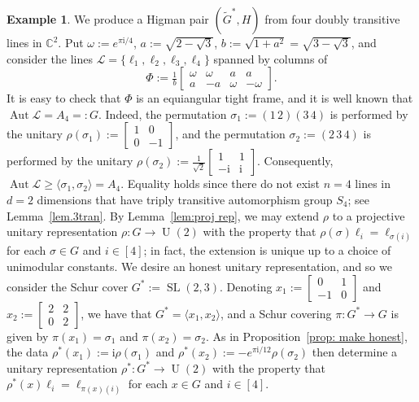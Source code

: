 \documentclass[11pt]{article}
\theoremstyle{definition}
\newtheorem{example}[theo]{Example}
\numberwithin{equation}{section}
\begin{document}
\begin{example}
\label{ex:Higman pair from 2x4}
We produce a Higman pair $(\tilde{G}^*,H)$ from four doubly transitive lines in $\mathbb{C}^2$.
Put $\omega := e^{\pi \mathrm{i}/4}$, $a := \sqrt{2 - \sqrt{3}}$, $b:=\sqrt{1+a^2} = \sqrt{3-\sqrt{3}}$, and consider the lines $\mathscr{L} = \{\ell_1,\ell_2,\ell_3,\ell_4\}$ spanned by columns of
\[
\Phi := \tfrac{1}{b}\left[ \begin{array}{rrrr}
\omega & \omega & a & a \\
a & -a & \omega & - \omega
\end{array} \right].
\]
It is easy to check that $\Phi$ is an equiangular tight frame, and it is well known that $\operatorname{Aut} \mathscr{L} = A_4 =: G$.
Indeed, the permutation $\sigma_1 := (1\, 2)(3\, 4)$ is performed by the unitary $\rho(\sigma_1):=\left[ \begin{smallmatrix} 1 & 0 \\ 0 & -1 \end{smallmatrix} \right]$, and the permutation $\sigma_2 := (2\, 3\, 4)$ is performed by the unitary $\rho(\sigma_2):=\tfrac{1}{\sqrt{2}} \left[ \begin{smallmatrix} 1 & 1 \\ -\mathrm{i} & \mathrm{i} \end{smallmatrix} \right]$.
Consequently, $\operatorname{Aut} \mathscr{L} \geq \langle \sigma_1,\sigma_2 \rangle = A_4$.
Equality holds since there do not exist $n=4$ lines in $d=2$ dimensions that have triply transitive automorphism group $S_4$; see Lemma~\ref{lem.3tran}.
By Lemma~\ref{lem:proj rep}, we may extend $\rho$ to a projective unitary representation $\rho \colon G \to \operatorname{U}(2)$ with the property that $\rho(\sigma) \ell_i = \ell_{\sigma(i)}$ for each $\sigma \in G$ and $i \in [4]$; in fact, the extension is unique up to a choice of unimodular constants.
We desire an honest unitary representation, and so we consider the Schur cover $G^*:= \operatorname{SL}(2,3)$.
Denoting $x_1:= \left[ \begin{smallmatrix} 0 & 1 \\ -1 & 0 \end{smallmatrix} \right]$ and $x_2 := \left[ \begin{smallmatrix} 2 & 2 \\ 0 & 2 \end{smallmatrix} \right]$, we have that $G^*=\langle x_1,x_2\rangle$, and a Schur covering $\pi \colon G^* \to G$ is given by $\pi(x_1) = \sigma_1$ and $\pi(x_2) = \sigma_2$.
As in Proposition~\ref{prop: make honest}, the data $\rho^*(x_1):=\mathrm{i} \rho(\sigma_1)$ and $\rho^*(x_2):= -e^{\pi \mathrm{i}/12} \rho(\sigma_2)$ then determine a unitary representation $\rho^* \colon G^* \to \operatorname{U}(2)$ with the property that $\rho^*(x) \ell_i = \ell_{\pi(x)(i)}$ for each $x \in G$ and $i \in [4]$.


\end{example}
\end{document}
